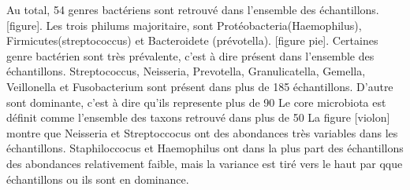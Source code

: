 \documentclass[12pt,a4paper]{article}
\begin{document}
Au total, 54 genres bactériens sont retrouvé dans l’ensemble des échantillons. [figure].
Les trois philums majoritaire, sont Protéobacteria(Haemophilus), Firmicutes(streptococcus) et Bacteroidete (prévotella). [figure pie].
Certaines genre bactérien sont très prévalente, c’est à dire présent dans l’ensemble des échantillons. Streptococcus, Neisseria, Prevotella, Granulicatella, Gemella, Veillonella et Fusobacterium sont présent dans plus de 185 échantillons.
D’autre sont dominante, c’est à dire qu’ils represente plus de 90%
Le core microbiota est définit comme l’ensemble des taxons retrouvé dans plus de 50%
La figure [violon] montre que Neisseria et Streptoccocus ont des abondances très variables dans les échantillons. Staphiloccocus et Haemophilus ont dans la plus part des échantillons des abondances relativement faible, mais la variance est tiré vers le haut par qque échantillons ou ils sont en dominance.
\end{document}
